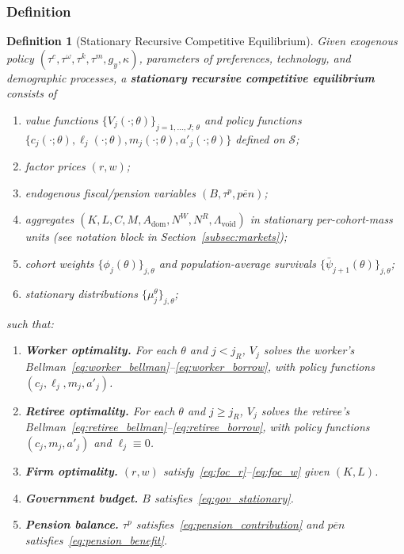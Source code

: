 \documentclass[12pt,a4paper]{article}
\newtheorem{definition}{Definition}
\begin{document}
\subsubsection{Definition}
 
\begin{definition}[Stationary Recursive Competitive Equilibrium]
\label{def:equilibrium}
Given exogenous policy $(\tau^c, \tau^\omega, \tau^k, \tau^m, g_y, \kappa)$, parameters of preferences, technology, and demographic processes, a \textbf{stationary recursive competitive equilibrium} consists of
\begin{enumerate}
\item value functions $\{V_j(\cdot; \theta)\}_{j = 1, \ldots, J;\, \theta}$ and policy functions $\{c_j(\cdot; \theta), \ell_j(\cdot; \theta), m_j(\cdot; \theta), a'_j(\cdot; \theta)\}$ defined on $\mathcal{S}$;
\item factor prices $(r, w)$;
\item endogenous fiscal/pension variables $(B, \tau^p, \overline{pen})$;
\item aggregates $(K, L, C, M, A_{\mathrm{dom}}, N^W, N^R, \Lambda_{\mathrm{void}})$ in stationary per-cohort-mass units (see notation block in Section~\ref{subsec:markets});
\item cohort weights $\{\phi_j(\theta)\}_{j, \theta}$ and population-average survivals $\{\bar\psi_{j+1}(\theta)\}_{j, \theta}$;
\item stationary distributions $\{\mu_j^\theta\}_{j, \theta}$;
\end{enumerate}
such that:
\begin{enumerate}
\item \textbf{Worker optimality.} For each $\theta$ and $j < j_R$, $V_j$ solves the worker's Bellman~\eqref{eq:worker_bellman}--\eqref{eq:worker_borrow}, with policy functions $(c_j, \ell_j, m_j, a'_j)$.
\item \textbf{Retiree optimality.} For each $\theta$ and $j \geq j_R$, $V_j$ solves the retiree's Bellman~\eqref{eq:retiree_bellman}--\eqref{eq:retiree_borrow}, with policy functions $(c_j, m_j, a'_j)$ and $\ell_j \equiv 0$.
\item \textbf{Firm optimality.} $(r, w)$ satisfy~\eqref{eq:foc_r}--\eqref{eq:foc_w} given $(K, L)$.
\item \textbf{Government budget.} $B$ satisfies~\eqref{eq:gov_stationary}.
\item \textbf{Pension balance.} $\tau^p$ satisfies~\eqref{eq:pension_contribution} and $\overline{pen}$ satisfies~\eqref{eq:pension_benefit}.

\end{enumerate}
\end{definition}
\end{document}
